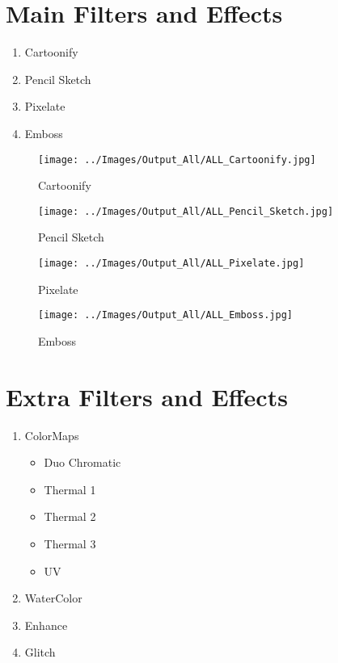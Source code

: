 \onecolumn
\chapter{Main Filters and Effects}
\label{MainEffectsAppendix}

\begin{enumerate}
	\item Cartoonify
	\item Pencil Sketch
	\item Pixelate
	\item Emboss
\end{enumerate}


\begin{figure}[h]
	\caption{Cartoonify}
	\centering
	\texttt{[image: ../Images/Output\_All/ALL\_Cartoonify.jpg]}
	\label{ALLCartoonify}
\end{figure}


\begin{figure}[h]
	\caption{Pencil Sketch}
	\centering
	\texttt{[image: ../Images/Output\_All/ALL\_Pencil\_Sketch.jpg]}
	\label{ALLPencilSKetch}
\end{figure}


\begin{figure}[h]
	\caption{Pixelate}
	\centering
	\texttt{[image: ../Images/Output\_All/ALL\_Pixelate.jpg]}
	\label{ALLPixelate}
\end{figure}

\begin{figure}[h]
	\caption{Emboss}
	\centering
	\texttt{[image: ../Images/Output\_All/ALL\_Emboss.jpg]}
	\label{ALLEmboss}
\end{figure}





\chapter{Extra Filters and Effects}
\label{ExtraEffectsAppendix}

\begin{enumerate}
	\item ColorMaps
	\begin{itemize}
		\item Duo Chromatic
		\item Thermal 1
		\item Thermal 2
		\item Thermal 3
		\item UV
	\end{itemize}
	\item WaterColor
	\item Enhance
	\item Glitch
\end{enumerate}


